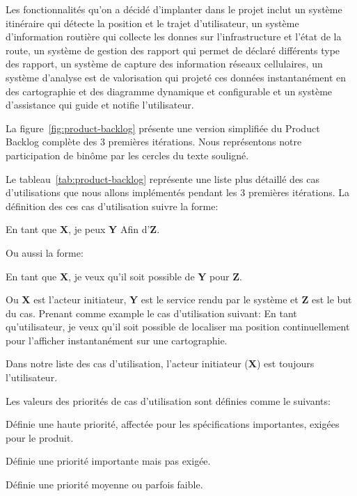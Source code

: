 Les fonctionnalités qu'on a décidé d'implanter dans le projet  inclut
un système itinéraire qui détecte la position et le trajet d'utilisateur,
un système d'information routière qui collecte les donnes sur l'infrastructure et
l'état de la route, un système de gestion des rapport qui permet de déclaré différents
type des rapport, un système de capture des information réseaux cellulaires,
un système
d'analyse est de valorisation qui projeté ces données instantanément
en des cartographie et des diagramme dynamique et configurable et un système d'assistance
qui guide et notifie l'utilisateur.


La figure~\ref{fig:product-backlog} présente une version simplifiée du Product
Backlog complète des 3 premières itérations. Nous représentons notre
participation de binôme par les cercles du texte souligné.



Le tableau~\ref{tab:product-backlog} représente une liste plus détaillé des cas
d'utilisations que nous allons implémentés pendant les 3 premières itérations.
La définition des ces cas d'utilisation suivre la forme:

\begin{displayquote}
    En tant que \textbf{X}, je peux \textbf{Y} Afin d'\textbf{Z}.
\end{displayquote}

Ou aussi la forme:

\begin{displayquote}
    En tant que \textbf{X}, je veux qu'il soit possible de \textbf{Y} pour
    \textbf{Z}.
\end{displayquote}

Ou \textbf{X} est l'acteur initiateur, \textbf{Y} est le service rendu par le
système et \textbf{Z} est le but du cas. Prenant comme example le cas
d'utilisation suivant: En tant qu'utilisateur, je veux qu'il soit possible de
localiser ma position continuellement pour l'afficher instantanément sur une
cartographie.

Dans notre liste des cas
d'utilisation, l'acteur initiateur (\textbf{X}) est toujours l'utilisateur.

Les valeurs des priorités de cas d'utilisation sont définies comme le suivants:

\begin{description}[align=right,labelwidth=1cm]
    \item [1:] Définie une haute priorité, affectée pour les spécifications
        importantes, exigées pour le produit.
    \item [2:] Définie une priorité importante mais pas exigée.
    \item [3:] Définie une priorité moyenne ou parfois faible.
\end{description}


